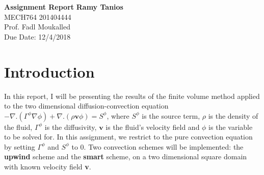 \documentclass[a4paper, 11pt]{article}
\begin{document}
\noindent
\large\textbf{Assignment Report} \hfill \textbf{Ramy Tanios} \\
\normalsize MECH764 \hfill 201404444 \\
Prof. Fadl Moukalled \hfill \\ \hfill Due Date: 12/4/2018

\section*{Introduction}
In this report, I will be presenting the results of the finite volume method applied to the two dimensional diffusion-convection equation $-\nabla.(\Gamma^{\phi}\nabla\phi)+\nabla.(\rho\mathbf{v}\phi)=S^{\phi}$, where $S^{\phi}$ is the source term, $\rho$ is the density of the fluid, $\Gamma^{\phi}$ is the diffusivity, $\mathbf{v}$ is the fluid's velocity field and $\phi$ is the variable to be solved for. In this assignment, we restrict to the pure convection equation by setting $\Gamma^{\phi}$ and $S^{\phi}$ to $0$. Two convection schemes will be implemented: the \textbf{upwind} scheme and the \textbf{smart} scheme, on a two dimensional square domain with known velocity field \textbf{v}.
\end{document}
